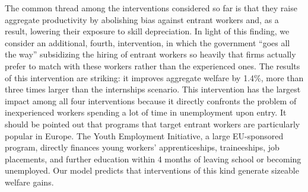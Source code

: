 \documentclass[12pt]{article} %
\theoremstyle{definition}
\begin{document}
The common thread among the interventions considered so far is that they raise aggregate productivity by abolishing bias against entrant workers and, as a result, lowering their exposure to skill depreciation.
In light of this finding, we consider an additional, fourth, intervention, in which the government ``goes all the way'' subsidizing the hiring of entrant workers so heavily that firms actually prefer to match with these workers rather than the experienced ones. 
The results of this intervention are striking: it improves aggregate welfare by 1.4\%, more than three times larger than the internships scenario.
This intervention has the largest impact among all four interventions because it directly confronts the problem of inexperienced workers spending a lot of time in unemployment upon entry.
It should be pointed out that programs that target entrant workers are particularly popular in Europe.
The Youth Employment Initiative, a large EU-sponsored program, directly finances young workers' apprenticeships, traineeships, job placements, and further education within 4 months of leaving school or becoming unemployed.
Our model predicts that interventions of this kind generate sizeable welfare gains.



\end{document}
